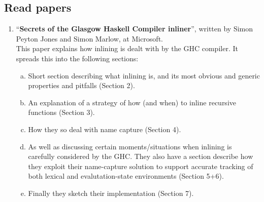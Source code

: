 \subsection{Read papers}

\begin{enumerate}[1)]
	\item ``\textbf{Secrets of the Glasgow Haskell Compiler inliner}'', written
by Simon Peyton Jones and Simon Marlow, at Microsoft. \\
This paper explains how inlining is dealt with by the GHC compiler. It spreads
this into the following sections:
\begin{enumerate}[a)]
	\item Short section describing what inlining is, and its most obvious and
generic properties and pitfalls (Section 2).
	\item An explanation of a strategy of how (and when) to inline recursive
functions (Section 3).
	\item How they so deal with name capture (Section 4).
	\item As well as discussing certain moments/situations when inlining is
carefully considered by the GHC. They also have a section describe how they
exploit their name-capture solution to support accurate tracking of both lexical
and evalutation-state environments (Section 5+6).
	\item Finally they sketch their implementation (Section 7).
\end{enumerate}


\end{enumerate}
